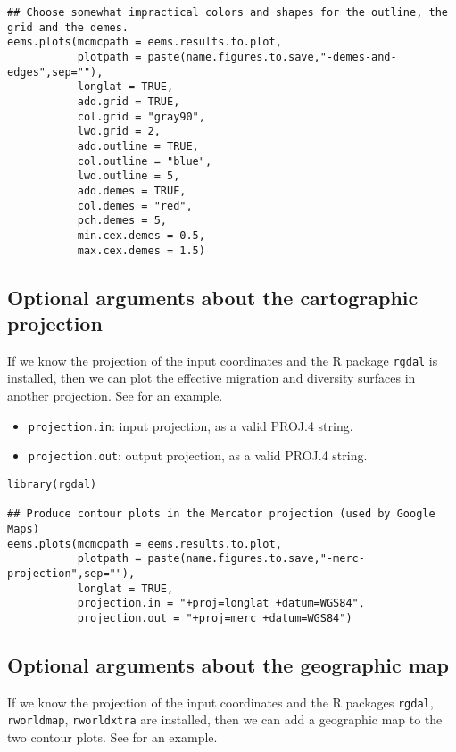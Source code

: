 \documentclass[a4paper,10pt,DIV=15,titlepage,mpinclude=true]{scrartcl}
\newcommand{\keystring}[1]{{\tt #1}}
\begin{document}
\begin{lstlisting}[style=Rcode]
## Choose somewhat impractical colors and shapes for the outline, the grid and the demes.
eems.plots(mcmcpath = eems.results.to.plot,
           plotpath = paste(name.figures.to.save,"-demes-and-edges",sep=""),
           longlat = TRUE,
           add.grid = TRUE,
           col.grid = "gray90",
           lwd.grid = 2,
           add.outline = TRUE,
           col.outline = "blue",
           lwd.outline = 5,
           add.demes = TRUE,
           col.demes = "red",
           pch.demes = 5,
           min.cex.demes = 0.5,
           max.cex.demes = 1.5)
\end{lstlisting}

\subsection{Optional arguments about the cartographic projection}

If we know the projection of the input coordinates and the R package \keystring{rgdal} is installed, then we can plot the effective migration and diversity surfaces in another projection. See  for an example.

\begin{itemize}
  \item \keystring{projection.in}: input projection, as a valid PROJ.4 string.
  \item \keystring{projection.out}: output projection, as a valid PROJ.4 string.
\end{itemize}

\begin{lstlisting}[style=Rcode]
library(rgdal)

## Produce contour plots in the Mercator projection (used by Google Maps)
eems.plots(mcmcpath = eems.results.to.plot,
           plotpath = paste(name.figures.to.save,"-merc-projection",sep=""),
           longlat = TRUE,
           projection.in = "+proj=longlat +datum=WGS84",
           projection.out = "+proj=merc +datum=WGS84")
\end{lstlisting}

\subsection{Optional arguments about the geographic map}

If we know the projection of the input coordinates and the R packages \keystring{rgdal}, \keystring{rworldmap}, \keystring{rworldxtra} are installed, then we can add a geographic map to the two contour plots. See  for an example.
\end{document}
